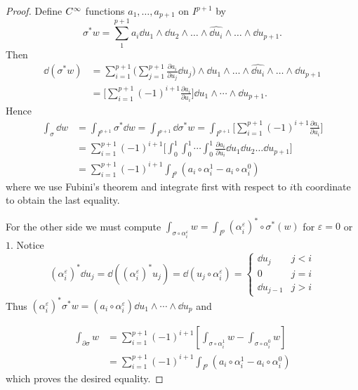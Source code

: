 \documentclass[../main]{subfiles}
\begin{document}
\begin{proof}
Define $C^\infty$ functions $a_{1}, \ldots, a_{p+1}$ on $I^{p+1}$ by \[\sigma^\ast w=\sum_1^{p + 1} a_{i} \dd u_{1} \wedge \dd u_2 \wedge \ldots \wedge \widehat {\dd u_i} \wedge \ldots \wedge \dd u_{p + 1}.\] Then
\begin{align*}
\dd(\sigma^\ast w) &= \sum_{i=1}^{p+1}\bigg(\sum_{j=1}^{p+1} \frac{\partial a_{i}}{\partial u_{j}} \dd u_{j}\bigg) \wedge \dd u_{1} \wedge \ldots \wedge \widehat {\dd u_i} \wedge \ldots \wedge \dd u_{p + 1} \\ &=\bigg[\sum_{i=1}^{p+1}(-1)^{i+1} \frac{\partial a_{i}}{\partial u_{i}}\bigg] \dd u_{1} \wedge \cdots \wedge \dd u_{p+1}.
\end{align*}
Hence
\begin{align*}
\int_{\sigma} \dd w & = \int_{I^{p+1}} \sigma^\ast \dd w = \int_{I^{p+1}} \dd \sigma^\ast w = \int_{I^{p+1}}\bigg[\sum_{i=1}^{p + 1} (-1)^{i + 1} \frac{\partial a_{i}}{\partial u_{i}}\bigg] \\ & = \sum_{i=1}^{p+1}(-1)^{i+1}\bigg[\int_{0}^{1} \int_{0}^{1} \cdots \int_{0}^{1} \frac{\partial a_{i}}{\partial u_{i}} \dd u_{1} \dd u_{2} \ldots \dd u_{p+1}\bigg] \\ & = \sum_{i=1}^{p+1}(-1)^{i+1} \int_{I^{p}}\left(a_{i} \circ \alpha_{i}^{1}-a_{i} \circ \alpha_{i}^{0}\right)
\end{align*}
where we use Fubini's theorem and integrate first with respect to $i$th coordinate to obtain the last equality.

For the other side we must compute $\displaystyle\int_{\sigma \circ \alpha_{i}^{\varepsilon}}w=\int_{I^{p}}(\alpha_{i}^{\varepsilon})^\ast \circ \sigma^\ast(w)$ for $\varepsilon=0$ or $1$. Notice \[(\alpha_{i}^{\varepsilon})^\ast \dd u_{j}=\dd((\alpha_{i}^{\varepsilon})^\ast u_{j})=\dd(u_{j} \circ \alpha_{i}^{\varepsilon})=\begin{cases}\dd u_{j} & j<i \\ 0&j=i \\ \dd u_{j-1} & j>i \end{cases}\] Thus $\left(\alpha_{i}^{\varepsilon}\right)^\ast \sigma^\ast w = \left(a_{i} \circ \alpha_{i}^{\varepsilon}\right) \dd u_{1} \wedge \cdots \wedge \dd u_{p}$ and

\begin{align*}
\int_{\partial \sigma} w & = \sum_{i=1}^{p+1}(-1)^{i+1}\left[\int_{\sigma \circ \alpha_{i}^{1}} w-\int_{\sigma \circ \alpha_{i}^{0}} w\right] \\ & = \sum_{i=1}^{p+1}(-1)^{i+1} \int_{I^{p}}\left(a_{i} \circ \alpha_{i}^{1}-a_{i} \circ \alpha_{i}^{0}\right)
\end{align*}
which proves the desired equality.
\end{proof}
\end{document}
